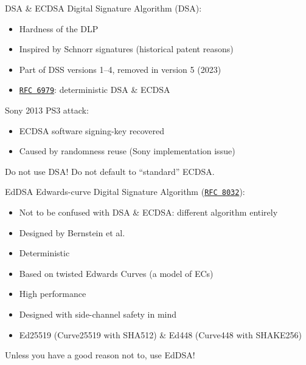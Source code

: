 \begin{frame}{DSA \& ECDSA}
  \pause
  Digital Signature Algorithm (DSA):
  \begin{itemize}[<+(1)->]
    \item Hardness of the DLP
    \item Inspired by Schnorr signatures (historical patent reasons)
    \item Part of DSS versions 1--4, removed in version 5 (2023)
    \item \href{https://datatracker.ietf.org/doc/html/rfc6979}{\texttt{RFC 6979}}: deterministic DSA \& ECDSA
  \end{itemize}

  \pause
  Sony 2013 PS3 attack:
  \begin{itemize}
    \item ECDSA software signing-key recovered
    \item Caused by randomness reuse (Sony implementation issue)
  \end{itemize}
 
  \pause
  Do not use DSA! Do not default to \enquote{standard} ECDSA.
\end{frame}

\begin{frame}{EdDSA}
  Edwards-curve Digital Signature Algorithm (\href{https://datatracker.ietf.org/doc/html/rfc8032}{\texttt{RFC 8032}}):
  \begin{itemize}[<+(1)->]
    \item Not to be confused with DSA \& ECDSA: different algorithm entirely
    \item Designed by \alert{Bernstein} et al.
    \item Deterministic
    \item Based on twisted Edwards Curves (a model of ECs)
    \item High performance
    \item Designed with side-channel safety in mind
    \item Ed25519 (Curve25519 with SHA512) \& Ed448 (Curve448 with SHAKE256)
  \end{itemize}

  \pause
  Unless you have a good reason not to, use EdDSA!
\end{frame}

